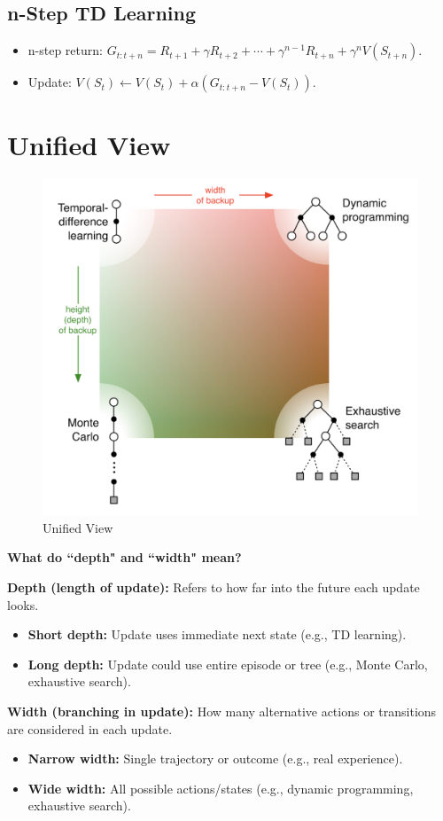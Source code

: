 \documentclass[12pt]{article}
\begin{document}
\subsection{n-Step TD Learning}
\begin{itemize}
    \item n-step return: $G_{t:t+n} = R_{t+1} + \gamma R_{t+2} + \cdots + \gamma^{n-1} R_{t+n} + \gamma^n V(S_{t+n})$.
    \item Update: $V(S_t) \leftarrow V(S_t) + \alpha (G_{t:t+n} - V(S_t))$.
\end{itemize}

\section{Unified View}

\begin{figure}[htbp]
    \centering
    \includegraphics[width=0.5\linewidth]{images/unified_view.png}
    \caption{Unified View}
    \label{fig:placeholder}
\end{figure}

\textbf{What do ``depth" and ``width" mean?}

\textbf{Depth (length of update):}
Refers to how far into the future each update looks.
\begin{itemize}
    \item \textbf{Short depth:} Update uses immediate next state (e.g., TD learning).
    \item \textbf{Long depth:} Update could use entire episode or tree (e.g., Monte Carlo, exhaustive search).
\end{itemize}

\textbf{Width (branching in update):}
How many alternative actions or transitions are considered in each update.
\begin{itemize}
    \item \textbf{Narrow width:} Single trajectory or outcome (e.g., real experience).
    \item \textbf{Wide width:} All possible actions/states (e.g., dynamic programming, exhaustive search).
\end{itemize}
\end{document}

